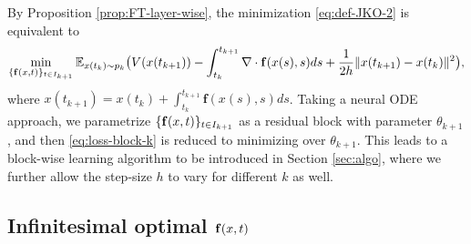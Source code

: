 \documentclass{article}
\theoremstyle{remark}
\theoremstyle{plain}
\newcommand{\E}{\mathbb{E}}
\begin{document}
By Proposition \ref{prop:FT-layer-wise}, 
 the minimization \eqref{eq:def-JKO-2} is equivalent to 
 \begin{equation}\label{eq:loss-block-k}  
 \min_{ \{ {\bf f}(x,t) \}_{t \in I_{k+1} } } 
  \E_{x( t_{k}) \sim p_k}  
\big(  V( x( t_{k+1})) -  \int_{t_{k} }^{ t_{k+1} }\nabla\cdot\mathbf{f}( x (s), s )ds  
 +\frac{1}{2h}  \|  x(t_{k+1})  -  x(t_{k})  \|^{2} \big), 
\end{equation}
where $x(t_{k+1}) = x(t_{k}) + \int_{t_{k} }^{ t_{k+1} }  \mathbf{f}( x (s), s ) ds$.
Taking a neural ODE approach, 
we parametrize $\{ {\bf f}(x,t) \}_{t \in I_{k+1} }$ as a residual block with parameter $\theta_{k+1}$,
and then \eqref{eq:loss-block-k} is reduced to minimizing over $\theta_{k+1}$. This leads to a block-wise learning algorithm to be introduced in Section \ref{sec:algo},
where we further allow the step-size $h$ to vary for different $k$ as well.



\subsection{Infinitesimal optimal ${\bf f}(x,t)$}\label{subsec:optimal-f}
\end{document}
